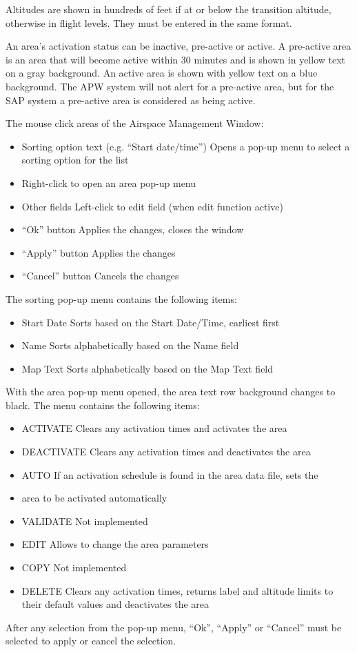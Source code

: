 \documentclass[11pt,a4paper]{memoir}
\begin{document}
Altitudes are shown in hundreds of feet if at or below the transition altitude, otherwise in flight levels. They must be entered in the same format.

An area’s activation status can be inactive, pre-active or active. A pre-active area is an area that will become active within 30 minutes and is shown in yellow text on a gray background. An active area is shown with yellow text on a blue background. The APW system will not alert for a pre-active area, but for the SAP system a pre-active area is considered as being active.

The mouse click areas of the Airspace Management Window:
\begin{itemize} 
        \item Sorting option text (e.g. “Start date/time”) Opens a pop-up menu to select a sorting option for the list 
        \item Right-click to open an area pop-up menu
        \item Other fields Left-click to edit field (when edit function active)
        \item “Ok” button Applies the changes, closes the window
        \item “Apply” button Applies the changes
        \item “Cancel” button Cancels the changes 
\end{itemize}

The sorting pop-up menu contains the following items:
\begin{itemize}
        \item Start Date Sorts based on the Start Date/Time, earliest first
        \item Name Sorts alphabetically based on the Name field
        \item Map Text Sorts alphabetically based on the Map Text field 
\end{itemize}
With the area pop-up menu opened, the area text row background changes to black. The menu contains the following items:
\begin{itemize}
        \item ACTIVATE Clears any activation times and activates the area
        \item DEACTIVATE Clears any activation times and deactivates the area
        \item AUTO If an activation schedule is found in the area data file, sets the
        \item area to be activated automatically
        \item VALIDATE Not implemented
        \item EDIT Allows to change the area parameters
        \item COPY Not implemented
        \item DELETE Clears any activation times, returns label and altitude limits to their default values and deactivates the area
\end{itemize}
After any selection from the pop-up menu, “Ok”, “Apply” or “Cancel” must be selected to apply or cancel the selection. 
\end{document}
